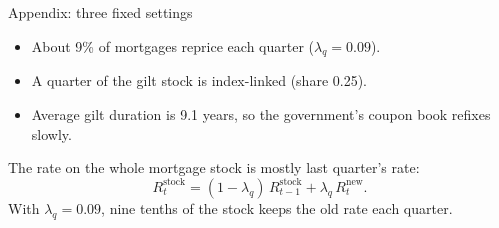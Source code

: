 \documentclass[11pt,aspectratio=169]{beamer}
\begin{document}
\begin{frame}{Appendix: three fixed settings}
  \begin{itemize}
    \item About 9\% of mortgages reprice each quarter
          ($\lambda_q = 0.09$).
    \item A quarter of the gilt stock is index-linked (share 0.25).
    \item Average gilt duration is 9.1 years, so the government's
          coupon book refixes slowly.
  \end{itemize}
  \vspace{0.4em}
  The rate on the whole mortgage stock is mostly last quarter's rate:
  \[
    R^{\mathrm{stock}}_{t}
      = (1-\lambda_q)\, R^{\mathrm{stock}}_{t-1}
      + \lambda_q\, R^{\mathrm{new}}_{t}.
  \]
  {\scriptsize With $\lambda_q = 0.09$, nine tenths of the stock keeps
  the old rate each quarter.}
\end{frame}
\end{document}
